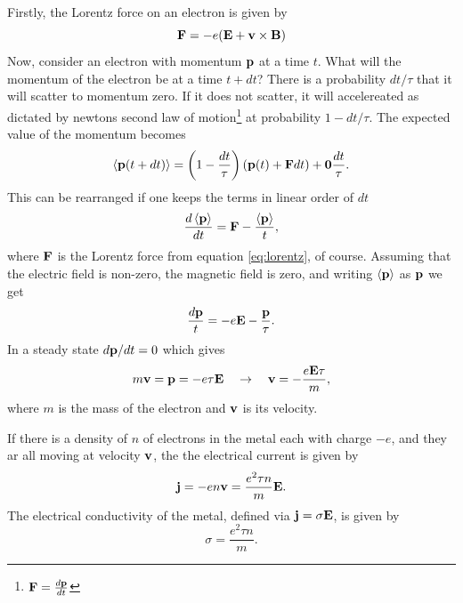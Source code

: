\documentclass[11pt]{amsart}
\begin{document}
Firstly, the Lorentz force on an electron is given by
\begin{equation}
\label{eq:lorentz}
\vb{F} = -e(\vb{E} + \vb{v} \times \vb{B})
\end{equation}
Now, consider an electron with momentum $\vb{p}$ at a time $t$. What will the momentum of the electron be at a time $t + dt$? There is a probability $dt/\tau$ that it will scatter to momentum zero. If it does not scatter, it will accelereated as dictated by newtons second law of motion\footnote{$\vb{F} = \frac{d\vb{p}}{dt}$} at probability $1 - dt/\tau$. The expected value of the momentum becomes 
\begin{equation}
\ev{\vb{p}(t + dt)} = \left( 1- \frac{dt}{\tau} \right) (\vb{p}(t) + \vb{F}dt) + \vb{0}\frac{dt}{\tau}.
\end{equation}
This can be rearranged if one keeps the terms in linear order of $dt$
\begin{equation}
\frac{d \ev{\vb{p}}}{dt} = \vb{F} - \frac{\ev{\vb{p}}}{t},
\end{equation}
where $\vb{F}$ is the Lorentz force from equation \ref{eq:lorentz}, of course. Assuming that the electric field is non-zero, the magnetic field is zero, and writing $\ev{\vb{p}}$ as $\vb{p}$ we get
\begin{equation}
\frac{d\vb{p}}{t} = -e\vb{E} -\frac{\vb{p}}{\tau}.
\end{equation}
In a steady state $d\vb{p}/dt= 0$ which gives
\begin{equation}
m\vb{v} = \vb{p} = -e\tau \vb{E} \quad \rightarrow \quad \vb{v} = -\frac{e\vb{E}\tau}{m},
\end{equation}
where $m$ is the mass of the electron and $\vb{v}$ is its velocity.

If there is a density of $n$ of electrons in the metal each with charge $-e$, and they ar all moving at velocity $\vb{v}$, the the electrical current is given by
\begin{equation}
\vb{j} = -en\vb{v} = \frac{e^2\tau n}{m}\vb{E}.
\end{equation}
The electrical conductivity of the metal, defined via $\vb{j} = \sigma\vb{E}$, is given by
\begin{equation}
\label{eq:electricalconductivity}
\sigma = \frac{e^2\tau n}{m}.
\end{equation}
\end{document}
